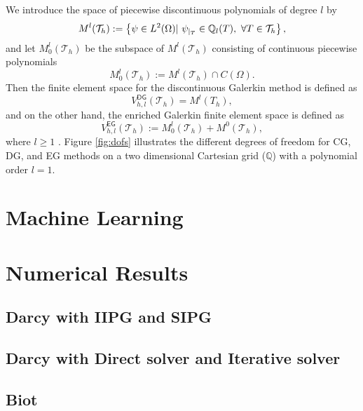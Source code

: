 \documentclass{article}
\begin{document}
We  introduce the space of piecewise discontinuous polynomials of degree $l$ by
\begin{equation}
M^l(\mathcal{T}_h) := \left \{ \psi \in L^2(\Omega) | \ \psi_{|_{T}} \in \mathbb{Q}_l(T), \ \forall T \in \mathcal{T}_h \right \}, 
\end{equation}
and let $M_0^l(\mathcal{T}_h)$ be the subspace of $M^l(\mathcal{T}_h)$ consisting of continuous piecewise polynomials
\begin{equation*}
M_0^l(\mathcal{T}_h) := M^l(\mathcal{T}_h) \cap {C}(\Omega). 
\end{equation*}
Then the finite element space for the discontinuous Galerkin method is defined as 
\begin{equation}
V^{\textsf{DG}}_{h,l} (\mathcal{T}_h) =M^l (T_h), 
\end{equation}
and on the other hand, the enriched Galerkin finite element space is defined as
\begin{equation}
V_{h,l}^{\textsf{EG}}(\mathcal{T}_h)  := M^l_0(\mathcal{T}_h) + M^0(\mathcal{T}_h),
\end{equation}
where $l \geq 1$ \cite{BecBurHansLar2003,LeeLeeWhi15,sunliu2009}.
Figure \ref{fig:dofs} illustrates the different degrees of freedom for CG, DG, and EG methods on a two dimensional Cartesian grid ($\mathbb{Q}$) with a polynomial order $l=1$. 



\section{Machine Learning}

\section{Numerical Results}

\subsection{Darcy with IIPG and SIPG}

\subsection{Darcy with Direct solver and Iterative solver}

\subsection{Biot}



\end{document}
